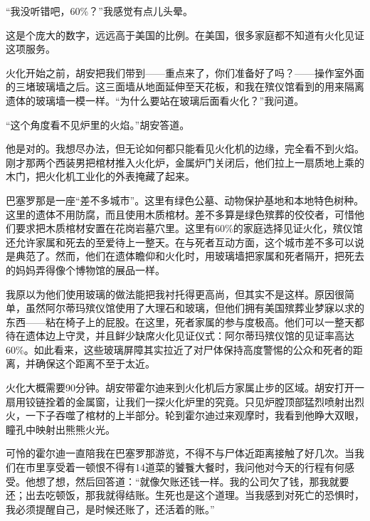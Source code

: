 \documentclass[12pt,oneside]{book}
\begin{document}
\begin{bookref}[frametitle={\cite{好好告别}}]
“我没听错吧，60\%？”我感觉有点儿头晕。

这是个庞大的数字，远远高于美国的比例。在美国，很多家庭都不知道有火化见证这项服务。

火化开始之前，胡安把我们带到——重点来了，你们准备好了吗？——操作室外面的三堵玻璃墙之后。这三面墙从地面延伸至天花板，和我在殡仪馆看到的用来隔离遗体的玻璃墙一模一样。“为什么要站在玻璃后面看火化？”我问道。

“这个角度看不见炉里的火焰。”胡安答道。

他是对的。我想尽办法，但无论如何都只能看见火化机的边缘，完全看不到火焰。刚才那两个西装男把棺材推入火化炉，金属炉门关闭后，他们拉上一扇质地上乘的木门，把火化机工业化的外表掩藏了起来。

巴塞罗那是一座“差不多城市”。这里有绿色公墓、动物保护基地和本地特色树种。这里的遗体不用防腐，而且使用木质棺材。差不多算是绿色殡葬的佼佼者，可惜他们要求把木质棺材安置在花岗岩墓穴里。这里有60\%的家庭选择见证火化，殡仪馆还允许家属和死去的至爱待上一整天。在与死者互动方面，这个城市差不多可以说是典范了。然而，他们在遗体瞻仰和火化时，用玻璃墙把家属和死者隔开，把死去的妈妈弄得像个博物馆的展品一样。

我原以为他们使用玻璃的做法能把我衬托得更高尚，但其实不是这样。原因很简单，虽然阿尔蒂玛殡仪馆使用了大理石和玻璃，但他们拥有美国殡葬业梦寐以求的东西——粘在椅子上的屁股。在这里，死者家属的参与度极高。他们可以一整天都待在遗体边上守灵，并且鲜少缺席火化见证仪式：阿尔蒂玛殡仪馆的见证率高达60\%。如此看来，这些玻璃屏障其实拉近了对尸体保持高度警惕的公众和死者的距离，并确保这个距离不至于太近。

火化大概需要90分钟。胡安带霍尔迪来到火化机后方家属止步的区域。胡安打开一扇用铰链拴着的金属窗，让我们一探火化炉里的究竟。只见炉膛顶部猛烈喷射出烈火，一下子吞噬了棺材的上半部分。轮到霍尔迪过来观摩时，我看到他睁大双眼，瞳孔中映射出熊熊火光。

可怜的霍尔迪一直陪我在巴塞罗那游览，不得不与尸体近距离接触了好几次。当我们在市里享受着一顿恨不得有14道菜的饕餮大餐时，我问他对今天的行程有何感受。他想了想，然后回答道：“就像欠账还钱一样。我的公司欠了钱，那我就要还；出去吃顿饭，那我就得结账。生死也是这个道理。当我感到对死亡的恐惧时，我必须提醒自己，是时候还账了，还活着的账。”

\end{bookref}
\end{document}

